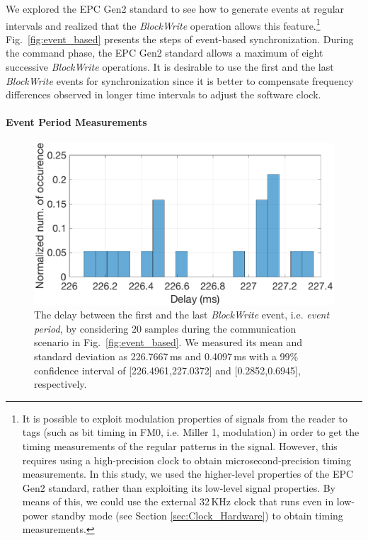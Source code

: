 \documentclass[journal,draftcls,onecolumn,12pt,twoside]{IEEEtranTCOM}
\begin{document}
We explored the EPC Gen2 standard to see how to generate events at regular intervals and realized that the \emph{BlockWrite} operation allows this feature.\footnote{It is possible to exploit modulation properties of signals from the reader to tags (such as bit timing in FM0, i.e. Miller 1, modulation) in order to get the timing measurements of the regular patterns in the signal. However, this requires using a high-precision clock to obtain microsecond-precision timing measurements. In this study, we used the higher-level properties of the EPC Gen2 standard, rather than exploiting its low-level signal properties. By means of this, we could  use the external 32\,KHz clock that runs even in low-power standby mode (see Section \ref{sec:Clock_Hardware}) to obtain timing measurements.} Fig.~\ref{fig:event_based} presents the steps of event-based synchronization. During the command phase, the EPC Gen2 standard allows a maximum of eight successive \emph{BlockWrite} operations. It is desirable to use the first and the last \emph{BlockWrite} events for synchronization since it is better to compensate frequency differences observed in longer time intervals to adjust the software clock. 

\paragraph{Event Period Measurements}
\label{subsec:event_period_uncertainty}

\begin{figure}
\centering
\includegraphics[scale=0.35]{figures/blockwrite_delay.eps}
\caption{\label{fig:block_write_delay}The delay between the first and the last \emph{BlockWrite} event, i.e. \emph{event period}, by considering 20 samples during the communication scenario in Fig.~\ref{fig:event_based}. We measured its mean and standard deviation as 226.7667\,ms and 0.4097\,ms with a 99\% confidence interval of [226.4961,227.0372] and [0.2852,0.6945], respectively.}
\end{figure}
\end{document}
